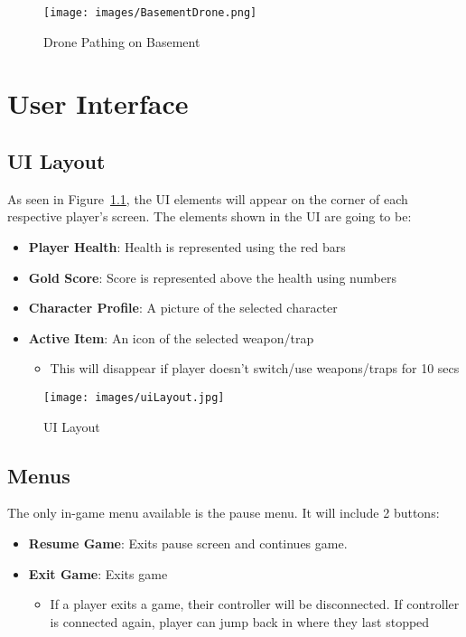 \documentclass[11pt]{report}
\begin{document}
\begin{figure}[H]
    \centering
    \texttt{[image: images/BasementDrone.png]}
    \caption{Drone Pathing on Basement}
\end{figure}

\chapter{User Interface}

\section{UI Layout}

As seen in Figure~\ref{fig:uilayout}, the UI elements will appear on the corner of each respective player's screen. The elements shown in the UI are going to be:

\begin{itemize}
\item \textbf{Player Health}: Health is represented using the red bars
\item \textbf{Gold Score}: Score is represented above the health using numbers
\item \textbf{Character Profile}: A picture of the selected character
\item \textbf{Active Item}: An icon of the selected weapon/trap 
    \begin{itemize}
        \item This will disappear if player doesn’t switch/use weapons/traps for 10 secs
    \end{itemize}
\end{itemize}

\begin{figure}[H]
	\texttt{[image: images/uiLayout.jpg]}
    \caption{UI Layout}
\label{fig:uilayout}
\end{figure}

\section{Menus}

The only in-game menu available is the pause menu. It will include 2 buttons:

\begin{itemize}
    \item \textbf{Resume Game}: Exits pause screen and continues game.
    \item \textbf{Exit Game}: Exits game
    \begin{itemize}
        \item If a player exits a game, their controller will be disconnected. If controller is connected again, player can jump back in where they last stopped 
    \end{itemize}
\end{itemize}
\end{document}

